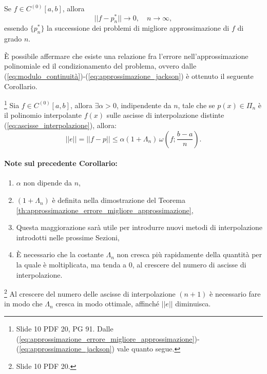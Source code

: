\begin{corollary}
    Se $f\in C^{(0)}[a,b]$, allora
    \begin{equation*}
        ||f-p^*_n||\rightarrow 0,\quad n\rightarrow\infty,
    \end{equation*}
    essendo $\{p^*_n\}$ la successione dei problemi di migliore approssimazione di $f$ di grado $n$.
\end{corollary}

È possibile affermare che esiste una relazione fra l'errore nell'approssimazione polinomiale ed il condizionamento del problema, ovvero dalle (\ref{eq:modulo_continuità})-(\ref{eq:approssimazione_jackson}) è ottenuto il seguente Corollario.

\begin{corollary}\footnote{Slide 10 PDF 20, PG 91. Dalle (\ref{eq:approssimazione_errore_migliore_approssimazione})-(\ref{eq:approssimazione_jackson}) vale quanto segue.}
    Sia $f\in C^{(0)}[a,b]$, allora $\exists\alpha > 0$, indipendente da $n$, tale che se $p(x)\in\Pi_n$ è il polinomio interpolante $f(x)$ sulle ascisse di interpolazione distinte (\ref{eq:ascisse_interpolazione}), allora:
    \begin{equation}\label{eq:approssimazione_errore}
        \boxed{||e||=||f-p||\leq \alpha (1+\Lambda_n)\,\omega\left(f;\frac{b-a}{n}\right).}
    \end{equation}
\end{corollary}

\paragraph{Note sul precedente Corollario:}
\begin{enumerate}
	\item $\alpha$ non dipende da $n$,
	\item $(1 + \Lambda_n)$ è definita nella dimostrazione del Teorema \ref{th:approssimazione_errore_migliore_approssimazione},
	\item Questa maggiorazione sarà utile per introdurre nuovi metodi di interpolazione introdotti nelle prossime Sezioni,
	\item È necessario che la costante $\Lambda_n$ non cresca più rapidamente della quantità per la quale è moltiplicata, ma tenda a 0, al crescere del numero di ascisse di interpolazione.
\end{enumerate}

\begin{remark}\footnote{Slide 10 PDF 20.}
    Al crescere del numero delle ascisse di interpolazione $(n+1)$ è necessario fare in modo che $\Lambda_n$ cresca in modo ottimale, affinché $||e||$ diminuisca.
\end{remark}

